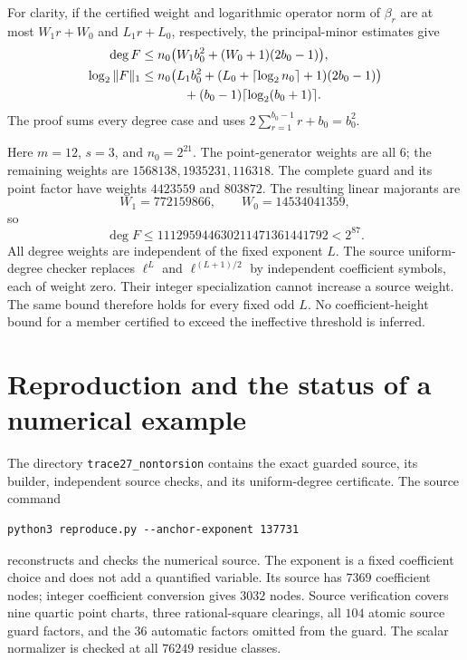 \documentclass[11pt,a4paper]{article}
\begin{document}
For clarity, if the certified weight and logarithmic operator
norm of $\beta_r$ are at most $W_1r+W_0$ and $L_1r+L_0$,
respectively, the principal-minor estimates give
\begin{align*}
 \deg F&\le n_0\bigl(W_1b_0^2+(W_0+1)(2b_0-1)\bigr),\\
 \log_2\|F\|_1&\le n_0\bigl(L_1b_0^2+
                   (L_0+\lceil\log_2n_0\rceil+1)(2b_0-1)\bigr)\\
 &\hspace{12mm}+(b_0-1)\lceil\log_2(b_0+1)\rceil.
\end{align*}
The proof sums every degree case and uses
$2\sum_{r=1}^{b_0-1}r+b_0=b_0^2$.

Here $m=12$, $s=3$, and $n_0=2^{21}$. The point-generator
weights are all 6; the remaining weights are
$1568138,1935231,116318$. The complete guard and its point
factor have weights $4423559$ and $803872$. The resulting
linear majorants are
\[
 W_1=772159866,\qquad W_0=14534041359,
\]
so
\[
 \deg F\le111295944630211471361441792<2^{87}.
\]
All degree weights are independent of the fixed exponent $L$.
The source uniform-degree checker replaces $\ell^L$ and
$\ell^{(L+1)/2}$ by independent coefficient symbols, each of
weight zero. Their integer specialization cannot increase a
source weight. The same bound therefore holds for every fixed
odd $L$. No coefficient-height bound for a member certified to
exceed the ineffective threshold is inferred.

\section{Reproduction and the status of a numerical example}

The directory \texttt{trace27\_nontorsion} contains the exact guarded
source, its builder, independent source checks, and its uniform-degree
certificate. The source command
\begin{verbatim}
python3 reproduce.py --anchor-exponent 137731
\end{verbatim}
reconstructs and checks the numerical source. The exponent is a fixed
coefficient choice and does not add a quantified variable. Its source
has $7369$ coefficient nodes; integer coefficient conversion gives
$3032$ nodes. Source verification covers nine quartic point charts,
three rational-square clearings, all $104$ atomic source guard factors,
and the $36$ automatic factors omitted from the guard. The scalar
normalizer is checked at all $76249$ residue classes.
\end{document}
